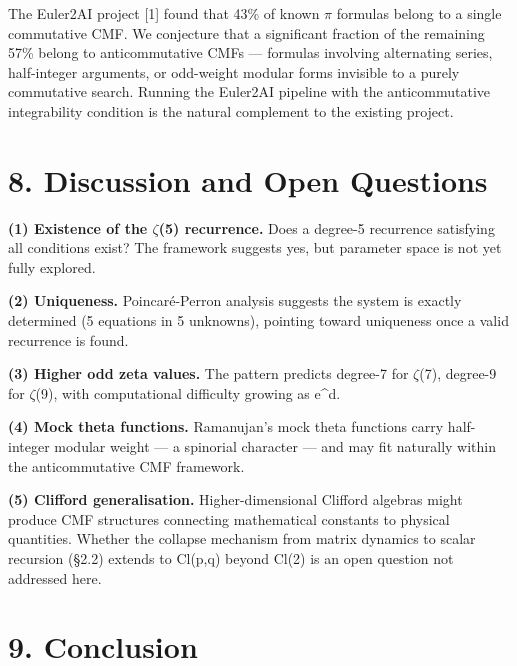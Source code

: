 \documentclass[11pt]{article}
\begin{document}
The Euler2AI project {[}1{]} found that 43\% of known \(\pi\) formulas
belong to a single commutative CMF. We conjecture that a significant
fraction of the remaining 57\% belong to anticommutative CMFs ---
formulas involving alternating series, half-integer arguments, or
odd-weight modular forms invisible to a purely commutative search.
Running the Euler2AI pipeline with the anticommutative integrability
condition is the natural complement to the existing project.

\hypertarget{discussion-and-open-questions}{%
\section{8. Discussion and Open
Questions}\label{discussion-and-open-questions}}

\textbf{(1) Existence of the \(\zeta\)(5) recurrence.} Does a degree-5
recurrence satisfying all conditions exist? The framework suggests yes,
but parameter space is not yet fully explored.

\textbf{(2) Uniqueness.} Poincaré-Perron analysis suggests the system is
exactly determined (5 equations in 5 unknowns), pointing toward
uniqueness once a valid recurrence is found.

\textbf{(3) Higher odd zeta values.} The pattern predicts degree-7 for
\(\zeta\)(7), degree-9 for \(\zeta\)(9), with computational difficulty
growing as e\^{}d.

\textbf{(4) Mock theta functions.} Ramanujan's mock theta functions
carry half-integer modular weight --- a spinorial character --- and may
fit naturally within the anticommutative CMF framework.

\textbf{(5) Clifford generalisation.} Higher-dimensional Clifford
algebras might produce CMF structures connecting mathematical constants
to physical quantities. Whether the collapse mechanism from matrix
dynamics to scalar recursion (§2.2) extends to Cl(p,q) beyond Cl(2) is
an open question not addressed here.

\hypertarget{conclusion}{%
\section{9. Conclusion}\label{conclusion}}
\end{document}
